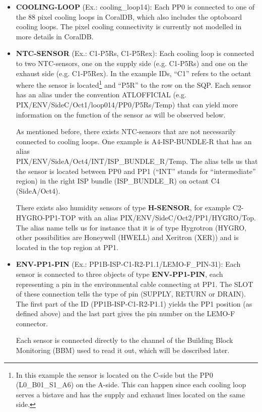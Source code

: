 \begin{itemize}
\item {\bf COOLING-LOOP} (Ex.: cooling\_loop14): Each PP0 is connected to one of the
88 pixel cooling loops in CoralDB, which also includes the  optoboard cooling loops. The pixel cooling
connectivity is currently not modelled in more details in CoralDB.
\item {\bf NTC-SENSOR} (Ex.: C1-P5Rs, C1-P5Rex): Each cooling loop is connected to two 
NTC-sensors, one on the supply side (e.g. C1-P5Rs) and one on the exhaust side (e.g. C1-P5Rex).
In the example IDs, ``C1'' refers to the octant where the sensor is located\footnote{In this 
example the sensor is located on the C-side but the PP0 (L0\_B01\_S1\_A6) on the A-side. This can
happen since
each cooling loop serves a bistave and has the supply and exhaust lines located on the same side.}
 and ``P5R'' to the row on the SQP.  Each sensor has an alias under the convention
ATLOFFICIAL (e.g. PIX/ENV/SideC/Oct1/loop014/PP0/P5Rs/Temp) that can yield more information
on the function of the sensor as will be observed below.

As mentioned before, there exists NTC-sensors that are not necessarily connected to cooling loops. 
One example is A4-ISP-BUNDLE-R that has an alias \\ PIX/ENV/SideA/Oct4/INT/ISP\_BUNDLE\_R/Temp.
The alias tells us that the sensor is located between PP0 and PP1 (``INT'' stands for ``intermediate''
region) in the right ISP bundle (ISP\_BUNDLE\_R) on octant C4 (SideA/Oct4).

There exists also humidity sensors of type {\bf H-SENSOR}, for example C2-HYGRO-PP1-TOP with 
an alias PIX/ENV/SideC/Oct2/PP1/HYGRO/Top. The alias name tells us for instance that it is
of type Hygrotron (HYGRO, other possibilities are Honeywell (HWELL) and Xeritron (XER)) 
and is located in the top region at PP1.

\item {\bf ENV-PP1-PIN} (Ex.: PP1B-ISP-C1-R2-P1.1/LEMO-F\_PIN-31): Each sensor is connected to
three objects of type {\bf ENV-PP1-PIN}, each representing a pin in the environmental cable
connecting at PP1. The SLOT of these connection tells the type of pin (SUPPLY, RETURN or DRAIN). The first
part of the ID (PP1B-ISP-C1-R2-P1.1) yields the PP1 position (as defined above) and the last
part gives the pin number on the LEMO-F connector.

Each sensor is connected directly to the channel of the Building Block Monitoring (BBM) used
to read it out, which will be described later.


\end{itemize}
